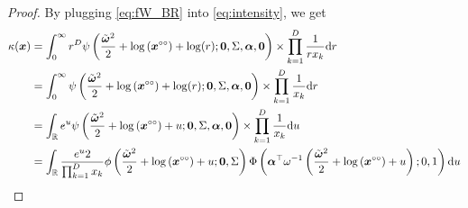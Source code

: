 \documentclass[12pt]{article}
\begin{document}
\begin{proof}
By plugging \eqref{eq:fW_BR} into \eqref{eq:intensity}, we get
%
\begin{align*}
\kappa(\bm x) &= \int_0^\infty r^D \psi\left( \frac{\tilde{\bm \omega}^2}{2} + \log\left(\bm x^{\circ\circ}\right) + \log(r); \bm 0, \Sigma, \bm \alpha, \bm 0\right) \times \prod_{k=1}^D \frac{1}{r x_k} \text dr \\
&= \int_0^\infty \psi\left( \frac{\tilde{\bm \omega}^2}{2} + \log\left(\bm x^{\circ\circ}\right) + \log(r); \bm 0, \Sigma, \bm \alpha, \bm 0\right) \times \prod_{k=1}^D \frac{1}{x_k} \text dr \\
&= \int_{\mathbb{R}} e^{u} \psi\left( \frac{\tilde{\bm \omega}^2}{2} + \log\left(\bm x^{\circ\circ}\right) + u; \bm 0, \Sigma, \bm \alpha, \bm 0\right) \times \prod_{k=1}^D \frac{1}{x_k} \text du \\
&= \int_{\mathbb{R}} \frac{e^{u} 2}{\prod_{k=1}^D x_k} \phi\left( \frac{\tilde{\bm \omega}^2}{2} + \log\left(\bm x^{\circ\circ}\right) + u; \bm 0, \Sigma\right) \Phi\left( \bm \alpha^\top \omega^{-1} \left( \frac{\tilde{\bm \omega}^2}{2} + \log\left(\bm x^{\circ\circ}\right) + u \right); 0, 1\right) \text du \\
\end{align*}


\end{proof}
\end{document}
